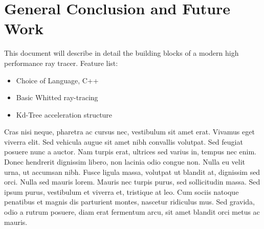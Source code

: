 \chapter{General Conclusion and Future Work}
This document will describe in detail the building blocks of a modern high performance ray tracer.
Feature list:
\begin{itemize}
\item Choice of Language, C++
\item Basic Whitted ray-tracing
\item Kd-Tree acceleration structure
\end{itemize}
Cras nisi neque, pharetra ac cursus nec, vestibulum sit amet erat. Vivamus eget viverra elit. Sed vehicula augue sit amet nibh convallis volutpat. Sed feugiat posuere nunc a auctor. Nam turpis erat, ultrices sed varius in, tempus nec enim. Donec hendrerit dignissim libero, non lacinia odio congue non. Nulla eu velit urna, ut accumsan nibh. Fusce ligula massa, volutpat ut blandit at, dignissim sed orci. Nulla sed mauris lorem. Mauris nec turpis purus, sed sollicitudin massa. Sed ipsum purus, vestibulum et viverra et, tristique at leo. Cum sociis natoque penatibus et magnis dis parturient montes, nascetur ridiculus mus. Sed gravida, odio a rutrum posuere, diam erat fermentum arcu, sit amet blandit orci metus ac mauris.
